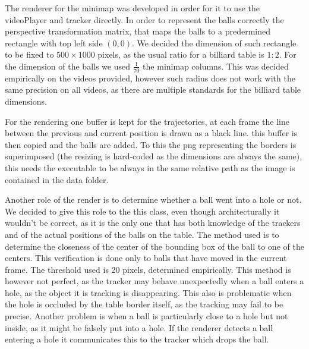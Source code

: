 The renderer for the minimap was developed in order for it to use the videoPlayer and 
tracker directly. In order to represent the balls correctly the perspective transformation
matrix, that maps the balls to a predermined rectangle with top left side $(0,0)$. We decided
the dimension of such rectangle to be fixed to $500 \times 1000$ pixels, as the usual ratio
for a billiard table is $1:2$. For the dimension of the balls we used $\frac{1}{70}$ the minimap
columns. This was decided empirically on the videos provided, however such radius does not work
with the same precision on all videos, as there are multiple standards for the billiard table 
dimensions.\par 
For the rendering one buffer is kept for the trajectories, at each frame the line between the
previous and current position is drawn as a black line. this buffer is then copied and the
balls are added. To this the png representing the borders is superimposed (the resizing is hard-coded
as the dimensions are always the same), this needs the executable to be always in the same relative
path as the image is contained in the data folder.\par 
Another role of the render is to determine whether a ball went into a hole or not. We decided to
give this role to the this class, even though architecturally it wouldn't be correct, as it is the 
only one that has both knowledge of the trackers and of the actual positions of the balls on the table.
The method used is to determine the closeness of the center of the bounding box of the ball to one 
of the centers. This verification is done only to balls that have moved in the current frame. The
threshold used is 20 pixels, determined empirically. This method is however not perfect, as the 
tracker may behave unexpectedly when a ball enters a hole, as the object it is tracking is disappearing.
This also is problematic when the hole is occluded by the table border itself, as the tracking may fail
to be precise. Another problem is when a ball is particularly close to a hole but not inside, as it
might be falsely put into a hole. If the renderer detects a ball entering a hole it communicates
this to the tracker which drops the ball.

